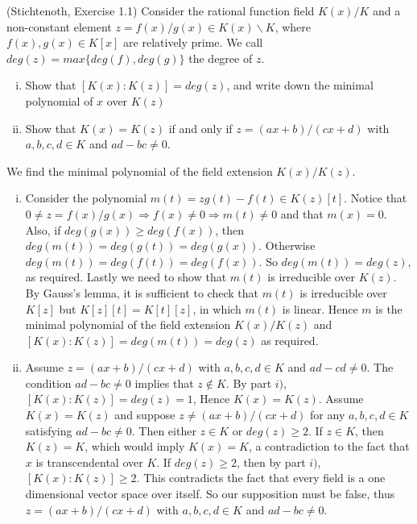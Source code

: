     
\begin{exercise}(Stichtenoth, Exercise 1.1)
Consider the rational function field $K(x)/K$ and a non-constant element 
$z = f(x)/g(x) \in K(x) \backslash K$, where $f(x),g(x) \in K[x]$ are 
relatively prime. We call $deg(z) = max \lbrace deg(f) , deg(g) \rbrace $ 
the degree of $z$.
\begin{enumerate}[(i)]
\item Show that $[K(x): K(z)] = deg(z)$, and write down the minimal 
polynomial of $x$ over $K(z)$
\item Show that $K(x)=K(z) $ if and only if $z = (ax+b)/(cx+d)$ with
$a,b,c,d \in K$ and $ad - bc \neq 0$.
\end{enumerate}
\end{exercise}

\begin{solution} 
We find the minimal polynomial of the field extension $K(x)/K(z)$.
\begin{enumerate}[(i)]

\item Consider the polynomial $m(t) = zg(t) - f(t) \in K(z)[t]$. 
Notice that $0 \neq z = f(x)/g(x) \Longrightarrow f(x) \neq 0 \Longrightarrow m(t) \neq 0$
and that $m(x) = 0$. Also, if $deg(g(x)) \geq deg(f(x))$, 
then $deg(m(t)) = deg(g(t)) = deg(g(x))$.
Otherwise $deg(m(t)) = deg(f(t)) = deg(f(x))$. So $deg(m(t)) = deg(z)$,
as required. Lastly we need to show that $m(t)$ is irreducible over
$K(z)$. By Gauss's lemma, it is sufficient to check that $m(t)$ is 
irreducible over $K[z]$ but $K[z][t]=K[t][z]$, in which $m(t)$ is linear. 
Hence $m$ is the minimal polynomial of the field extension $K(x)/K(z)$ 
and $[K(x):K(z)] = deg(m(t)) = deg(z)$ as required.

\item Assume $z = (ax+b)/(cx + d)$ with $a,b,c,d \in K$ and 
$ad - cd \neq 0$. The condition $ad-bc \neq 0 $ implies that 
$z \notin K$. By part $i)$, $[K(x):K(z)] = deg(z) = 1$, Hence 
$K(x) = K(z)$. Assume $K(x) = K(z)$ and suppose $z \neq (ax+b)/(cx + d) $ 
for any $a,b,c,d \in K$ satisfying $ad - bc \neq 0$. Then 
either $z \in K$ or $deg(z) \geq 2$. If $z \in K$, then $K(z) = K$, 
which would imply $K(x) = K$, a contradiction to the fact 
that $x$ is transcendental over $K$. If $deg(z) \geq 2$, 
then by part $i)$, $[K(x):K(z)] \geq 2$. This contradicts the fact 
that every field is a one dimensional vector space over itself. 
So our supposition must be false, thus $z = (ax+b)/(cx+d)$ with 
$a,b,c,d \in K$ and $ad - bc \neq 0$.

\end{enumerate}
\end{solution}


